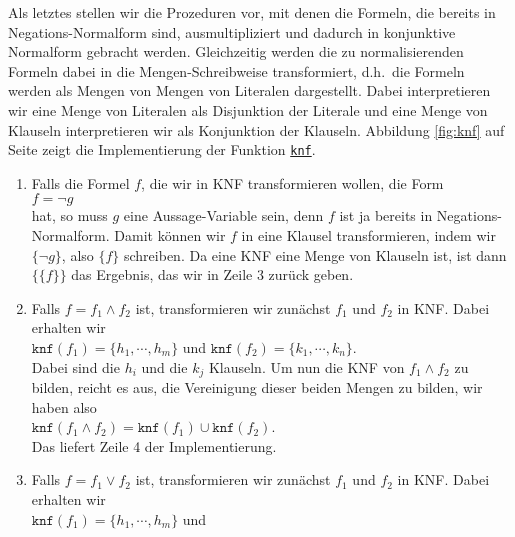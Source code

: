 Als letztes stellen wir die Prozeduren vor, mit denen die Formeln, die bereits in
Negations-Normalform sind, ausmultipliziert und dadurch in konjunktive
Normalform gebracht werden.  Gleichzeitig werden  die zu normalisierenden Formeln dabei
in die Mengen-Schreibweise transformiert, d.h.~die Formeln werden als Mengen von Mengen 
von Literalen dargestellt.  Dabei interpretieren wir eine Menge von Literalen als
Disjunktion der Literale und eine Menge von Klauseln interpretieren wir als Konjunktion
der Klauseln.
Abbildung \ref{fig:knf} auf Seite \pageref{fig:knf} zeigt die Implementierung der Funktion
\href{https://github.com/karlstroetmann/Logik/blob/master/SetlX/knf.stlx}{\texttt{knf}}.
\begin{enumerate}
\item Falls die Formel $f$, die wir in KNF transformieren wollen, die Form \\[0.2cm]
      \hspace*{1.3cm} $f = \neg g$ \\[0.2cm]
      hat, so muss $g$ eine Aussage-Variable sein, denn $f$ ist ja bereits in
      Negations-Normalform.  Damit k\"{o}nnen wir $f$ in eine Klausel transformieren, 
      indem wir $\{\neg g\}$, also $\{f\}$ schreiben.  
      Da eine KNF eine Menge von Klauseln ist, ist dann 
      $\bigl\{\{f\}\bigr\}$ das Ergebnis, das wir in Zeile 3 zur\"{u}ck geben.
\item Falls $f= f_1 \wedge f_2$ ist, transformieren wir zun\"{a}chst $f_1$ und $f_2$ in KNF.
      Dabei erhalten wir \\[0.2cm]
      \hspace*{1.3cm} 
      $\texttt{knf}(f_1) = \{ h_1, \cdots, h_m \}$ \quad und \quad
      $\texttt{knf}(f_2) = \{ k_1, \cdots, k_n \}$. \\[0.2cm]
      Dabei sind die $h_i$ und die $k_j$ Klauseln.  Um nun die KNF von $f_1 \wedge f_2$ 
      zu bilden, reicht es aus, die Vereinigung dieser beiden Mengen zu bilden,
      wir haben also \\[0.2cm]
      \hspace*{1.3cm} $\texttt{knf}(f_1 \wedge f_2) = \texttt{knf}(f_1) \cup  \texttt{knf}(f_2)$.
      \\[0.2cm]
      Das liefert Zeile 4 der Implementierung.
\item Falls $f= f_1 \vee f_2$ ist, transformieren wir zun\"{a}chst $f_1$ und $f_2$ in KNF.
      Dabei erhalten wir \\[0.2cm]
      \hspace*{1.3cm} 
      $\texttt{knf}(f_1) = \{ h_1, \cdots, h_m \}$ \quad und \quad

\end{enumerate}
